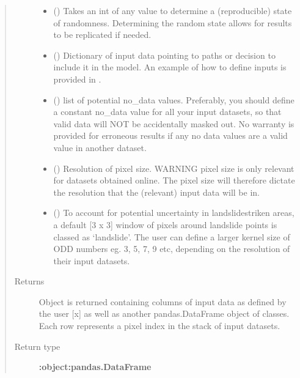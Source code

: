 \documentclass[letterpaper,10pt,english]{sphinxmanual}
\begin{document}
\begin{fulllineitems}
\begin{quote}
\begin{description}
\begin{itemize}
\item {} 
 () \textendash{} Takes an int of any value to determine a (reproducible) state of randomness.
Determining the random state allows for results to be replicated if needed.

\item {} 
 () \textendash{} Dictionary of input data pointing to paths or decision to include
it in the model. An example of how to define inputs is provided
in .

\item {} 
 () \textendash{} list of potential no\_data values. Preferably, you should define
a constant no\_data value for all your input datasets, so that valid
data will NOT be accidentally masked out. No warranty is provided
for erroneous results if any no data values are a valid value in
another dataset.

\item {} 
 () \textendash{} Resolution of pixel size. WARNING \sphinxhyphen{} pixel size is only relevant
for datasets obtained online. The pixel size will therefore
dictate the resolution that the (relevant) input data will be in.

\item {} 
 () \textendash{} To account for potential uncertainty in landslide\sphinxhyphen{}striken areas,
a default {[}3 x 3{]} window of pixels around landslide points
is classed as ‘landslide’. The user can define a larger kernel size
of ODD numbers eg. 3, 5, 7, 9 etc, depending on the resolution
of their input datasets.

\end{itemize}

\item[{Returns}] \leavevmode
Object is returned containing columns of input data as defined by
the user {[}x{]} as well as another pandas.DataFrame object of classes.
Each row represents a pixel index in the stack of input datasets.

\item[{Return type}] \leavevmode
{\color{red}\bfseries{}:object:\textasciigrave{}pandas.DataFrame\textasciigrave{}}


\end{description}
\end{quote}
\end{fulllineitems}
\end{document}
